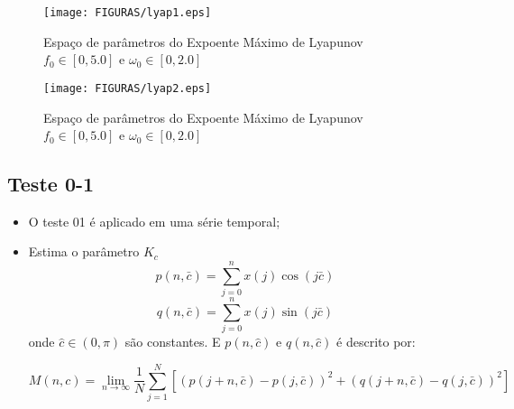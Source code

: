\documentclass[12pt,aspectratio=169]{beamer}
\begin{document}
\begin{frame}{}
\begin{figure}[h]
\centering
\texttt{[image: FIGURAS/lyap1.eps]} 
\caption{Espaço de parâmetros do Expoente Máximo de Lyapunov $f_0 \in [0,5.0]$ e $\omega_0 \in [0,2.0]$}
\label{fig:04}
\end{figure}
\end{frame}

\begin{frame}
\begin{figure}[h]
\centering
\texttt{[image: FIGURAS/lyap2.eps]} 
\caption{Espaço de parâmetros do Expoente Máximo de Lyapunov  $f_0 \in [0,5.0]$ e $\omega_0 \in [0,2.0]$}
\label{fig:05}
\end{figure}
\end{frame}



\subsection{Teste 0-1}
\begin{frame}
\begin{itemize}
    \item O teste 01 é aplicado em uma série temporal;
    \item Estima o parâmetro $K_c$
    \begin{equation} \label{eq:08t01} 
p\left(n,\bar{c}\right)=\sum _{j=0}^{n}x\left(j\right)\cos \left(j\bar{c}\right)  
\end{equation} 
\begin{equation} \label{eq:09t01} 
q\left(n,\bar{c}\right)=\sum _{j=0}^{n}x\left(j\right)\sin \left(j\bar{c}\right)  
\end{equation} 
\noindent onde $\hat{c}\in \left(0,\pi \right)$ são constantes. E $p\left(n,\hat{c}\right)$ e $q\left(n,\hat{c}\right)$ é descrito por: 

\begin{equation} \label{eq:10t01} 
M(n,c)={\mathop{\lim }\limits_{n\to \infty }} \frac{1}{N} \sum _{j=1}^{N}\left[\left(p(j+n,\bar{c})-p(j,\bar{c})\right)^{2} +\left(q(j+n,\bar{c})-q(j,\bar{c})\right)^{2} \right]  
\end{equation} 
\end{itemize}
\end{frame}
\end{document}
